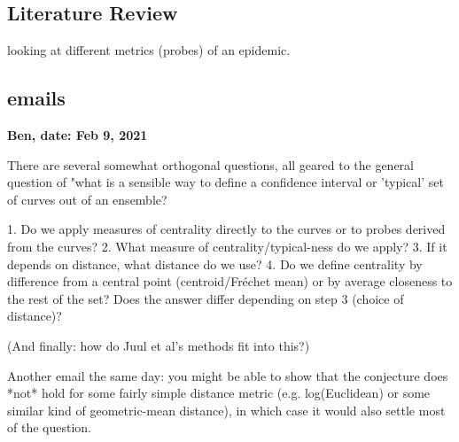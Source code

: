 \documentclass[12pt]{article}
\theoremstyle{definition} %
\begin{document}
\subsection{Literature Review}
\citep{juul2021fixed}

\cite{probert2016decision} looking at different metrics (probes) of an epidemic.
\subsection{emails}

{\bf Ben,  
date: Feb 9, 2021}

There are several somewhat orthogonal questions, all geared to the general question of "what is a sensible way to define a confidence interval or 'typical' set of curves out of an ensemble?

 1. Do we apply measures of centrality directly to the curves or to
probes derived from the curves?
 2.  What measure of centrality/typical-ness do we apply?
 3.  If it depends on distance, what distance do we use?
 4. Do we define centrality by difference from a central point
(centroid/Fréchet mean) or by average closeness to the rest of the
set? Does the answer differ depending on step 3 (choice of distance)?

(And finally: how do Juul et al's methods fit into this?)

Another email the same day:
you might be able to show that the conjecture does *not* hold for some fairly simple distance metric (e.g. log(Euclidean) or some similar kind of geometric-mean distance), in which case it would also settle most of the question.
\end{document}
